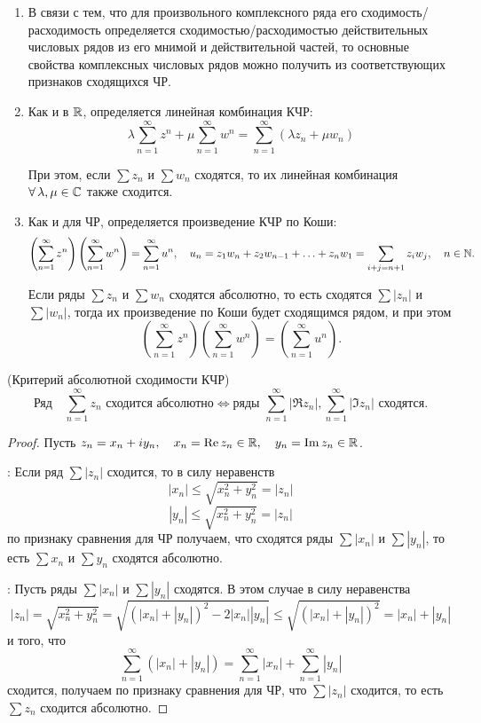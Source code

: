 \documentclass[../../main.tex]{subfiles}
\begin{document}
\begin{rems}
	\begin{enumerate}
		\;
		
		\item В связи с тем, что для произвольного комплексного ряда его 
		сходимость/расходимость определяется сходимостью/расходимостью 
		действительных 
		числовых рядов из его мнимой и действительной частей, то основные свойства 
		комплексных числовых рядов можно получить из соответствующих признаков 
		сходящихся ЧР.
		
		\item Как и в $ \mathbb{R} $, определяется линейная комбинация КЧР:
		\[\lambda \sum_{n=1}^{\infty}z^n + \mu \sum_{n=1}^{\infty}w^n = 
		\sum_{n=1}^{\infty}(\lambda z_n + \mu w_n)\]
		
		При этом, если $ \sum z_n $ и $ \sum w_n $ сходятся, то их линейная 
		комбинация $ \forall\, \lambda, \mu \in \mathbb{C} $ также сходится.
		
		\item Как и для ЧР, определяется произведение КЧР по Коши:
		\[\left(\sum_{n=1}^{\infty}z^n\right)\left(\sum_{n=1}^{\infty}w^n\right) 
		= \sum_{n=1}^{\infty} 
		u^n, \quad u_n = z_1w_{n} + z_2w_{n - 1} + \ldots + z_nw_1 = \sum_{i + j = n 
		+ 1} z_iw_j, \quad n \in \mathbb{N}.\]
		
		Если ряды $ \sum z_n $ и $ \sum w_n $ сходятся абсолютно, то есть сходятся $ 
		\sum |z_n| $ и $ \sum |w_n| $, тогда их произведение по Коши будет 
		сходящимся рядом, и при этом
		\[\left(\sum_{n=1}^{\infty}z^n\right)\left(\sum_{n=1}^{\infty}w^n\right) = 
		\left(\sum_{n=1}^{\infty}u^n\right).\]
	\end{enumerate}
\end{rems}

\begin{thm}(Критерий абсолютной сходимости КЧР)
	\[\text{Ряд} \quad \sum_{n=1}^{\infty}z_n \text{ сходится абсолютно} \iff 
	\text{ряды } \sum_{n=1}^{\infty}|\Re z_n|, \sum_{n=1}^{\infty}|\Im z_n| 
	\text{ сходятся.}\]
\end{thm}
\begin{proof}
	Пусть $ z_n = x_n + iy_n, \quad x_n = \operatorname{Re} z_n \in \mathbb{R}, \quad y_n = \operatorname{Im} z_n \in 
	\mathbb{R} $.
	
	\nec: Если ряд $ \sum |z_n| $ сходится, то в силу неравенств
	\[|x_n| \leq \sqrt{x_n^2 + y_n^2} = |z_n|\]
	\[|y_n| \leq \sqrt{x_n^2 + y_n^2} = |z_n|\]
	по признаку сравнения для ЧР получаем, что сходятся ряды $ \sum |x_n| $ и $ 
	\sum |y_n| $, то есть $ \sum x_n $ и $ \sum y_n $ сходятся абсолютно.
	
	\suff: Пусть ряды $ \sum |x_n| $ и $ \sum |y_n| $ сходятся. В этом случае в 
	силу неравенства
	\[|z_n| = \sqrt{x_n^2 + y_n^2} = \sqrt{(|x_n| + |y_n|)^2 - 2|x_n||y_n|} \leq 
	\sqrt{(|x_n| + |y_n|)^2} = |x_n| + |y_n|\]
	и того, что
	\[\sum_{n=1}^{\infty}(|x_n| + |y_n|) = \sum_{n=1}^{\infty}|x_n| + 
	\sum_{n=1}^{\infty}|y_n|\]
	сходится, получаем по признаку сравнения для ЧР, что $ \sum |z_n| $ сходится, 
	то есть  $ \sum z_n $ сходится абсолютно.
\end{proof}
\end{document}
